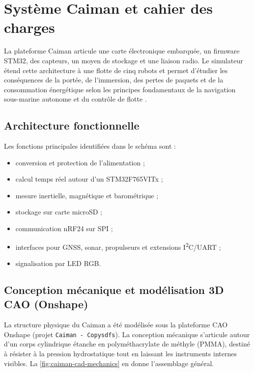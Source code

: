 \chapter{Système Caiman et cahier des charges}
\label{chap:systeme}

La plateforme Caiman articule une carte électronique embarquée, un firmware STM32, des capteurs, un moyen de stockage et une liaison radio. Le simulateur étend cette architecture à une flotte de cinq robots et permet d'étudier les conséquences de la portée, de l'immersion, des pertes de paquets et de la consommation énergétique selon les principes fondamentaux de la navigation sous-marine autonome et du contrôle de flotte \cite{fossen2011handbook, paull2013auv}.

\section{Architecture fonctionnelle}

Les fonctions principales identifiées dans le schéma sont :

\begin{itemize}
  \item conversion et protection de l'alimentation ;
  \item calcul temps réel autour d'un STM32F765VITx ;
  \item mesure inertielle, magnétique et barométrique ;
  \item stockage sur carte microSD ;
  \item communication nRF24 sur SPI ;
  \item interfaces pour GNSS, sonar, propulseurs et extensions I\textsuperscript{2}C/UART ;
  \item signalisation par LED RGB.
\end{itemize}

\section{Conception mécanique et modélisation 3D CAO (Onshape)}

La structure physique du Caiman a été modélisée sous la plateforme CAO Onshape (projet \texttt{Caiman - Copysdfs}). La conception mécanique s'articule autour d'un corps cylindrique étanche en polyméthacrylate de méthyle (PMMA), destiné à résister à la pression hydrostatique tout en laissant les instruments internes visibles. La \cref{fig:caiman-cad-mechanics} en donne l'assemblage général.

